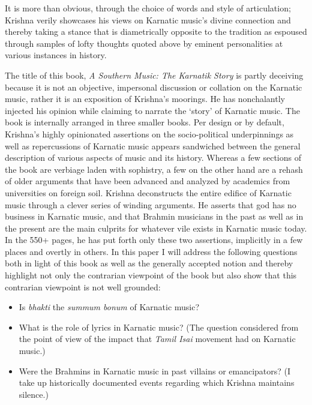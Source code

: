 It is more than obvious, through the choice of words and style of articulation; Krishna verily showcases his views on Karnatic music’s divine connection and thereby taking a stance that is diametrically opposite to the tradition as espoused through samples of lofty thoughts quoted above by eminent personalities at various instances in history.

The title of this book, \textit{A Southern Music: The Karnatik Story} is partly deceiving because it is not an objective, impersonal discussion or collation on the Karnatic music, rather it is an exposition of Krishna’s moorings. He has nonchalantly injected his opinion while claiming to narrate the ‘story’ of Karnatic music. The book is internally arranged in three smaller books. Per design or by default, Krishna’s highly opinionated assertions on the socio-political underpinnings as well as repercussions of Karnatic music appears sandwiched between the general description of various aspects of music and its history. Whereas a few sections of the book are verbiage laden with sophistry, a few on the other hand are a rehash of older arguments that have been advanced and analyzed by academics from universities on foreign soil. Krishna deconstructs the entire edifice of Karnatic music through a clever series of winding arguments. He asserts that god has no business in Karnatic music, and that Brahmin musicians in the past as well as in the present are the main culprits for whatever vile exists in Karnatic music today. In the 550+ pages, he has put forth only these two assertions, implicitly in a few places and overtly in others. In this paper I will address the following questions both in light of this book as well as the generally accepted notion and thereby highlight not only the contrarian viewpoint of the book but also show that this contrarian viewpoint is not well grounded:

\begin{itemize}
\itemsep=0pt

 \item Is \textit{bhakti} the \textit{summum bonum} of Karnatic music?

 \item What is the role of lyrics in Karnatic music? (The question considered from the point of view of the impact that \textit{Tamil Isai} movement had on Karnatic music.)

 \item Were the Brahmins in Karnatic music in past villains or emancipators? (I take up historically documented events regarding which Krishna maintains silence.)

\end{itemize}

